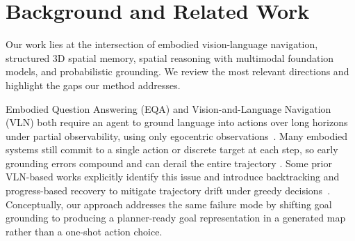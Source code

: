 \section{Background and Related Work}
Our work lies at the intersection of embodied vision-language navigation, structured $3$D spatial memory, spatial reasoning with multimodal foundation models, and probabilistic grounding. We review the most relevant directions and highlight the gaps our method addresses. %

Embodied Question Answering (EQA) and Vision-and-Language Navigation (VLN) both require an agent to ground language into actions over long horizons under partial observability, using only egocentric observations~\cite{das2018embodiedqa}.
Many embodied systems still commit to a single action or discrete target at each step, so early grounding errors compound and can derail the entire trajectory \cite{cohen2024surveyroboticlanguagegrounding,ahn2022saycan, dai2024thinkactaskopenworld}.
Some prior VLN-based works explicitly identify this issue and introduce backtracking and progress-based recovery to mitigate trajectory drift under greedy decisions~\cite{ma2019regretful}.
Conceptually, our approach addresses the same failure mode by shifting goal grounding to producing a planner-ready goal representation in a generated map rather than a one-shot action choice.

